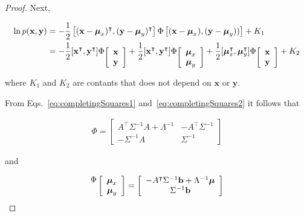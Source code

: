 \begin{proof}
    Next,

    \begin{align}
        \ln p(\mathbf{x},\mathbf{y})&=-\frac{1}{2}\left[(\mathbf{x}-\boldsymbol{\mu}_x)^\intercal,(\mathbf{y}-\boldsymbol{\mu}_y)^\intercal\right]\Phi\left[(\mathbf{x}-\boldsymbol{\mu}_x),(\mathbf{y}-\boldsymbol{\mu}_y))\right]+K_1\nonumber\\
                                    &=-\frac{1}{2}[\mathbf{x}^\intercal,\mathbf{y}^\intercal]\Phi\raisebox{-0.7em}{$\left[\begin{array}{c}\mathbf{x}\\\mathbf{y}\end{array}\right]$}+\frac{1}{2}[\mathbf{x}^\intercal,\mathbf{y}^\intercal]\Phi\raisebox{-0.7em}{$\left[\begin{array}{c}\boldsymbol{\mu}_x\\\boldsymbol{\mu}_y\end{array}\right]$}+\frac{1}{2}[\boldsymbol{\mu}_x^\intercal,\boldsymbol{\mu}_y^\intercal]\Phi\raisebox{-0.7em}{$\left[\begin{array}{c}\mathbf{x}\\\mathbf{y}\end{array}\right]$}+K_2\label{eq:completingSquares2}
    \end{align}

    \noindent where $K_1$ and $K_2$ are contants that does not depend on $\mathbf{x}$ or
    $\mathbf{y}$.


    From Eqs.~\ref{eq:completingSquares1} and~\ref{eq:completingSquares2}
    it follows that

    \begin{align}
        \Phi=\left[\begin{array}{cc}
                       A^\intercal\Sigma^{-1}A+\Lambda^{-1}&-A^\intercal\Sigma^{-1}\nonumber\\
                       -\Sigma^{-1}A&\Sigma^{-1}
                   \end{array}\right]
    \end{align}

    \noindent and

    \begin{align*}
        \raisebox{0.7em}{$\Phi$}\left[\begin{array}{c}\boldsymbol{\mu}_x\\\boldsymbol{\mu}_y\end{array}\right]=
            \left[\begin{array}{c}
                      -A^\intercal\Sigma^{-1}\mathbf{b}+\Lambda^{-1}\boldsymbol{\mu}\\
                      \Sigma^{-1}\mathbf{b}
                  \end{array}\right]
    \end{align*}


\end{proof}
